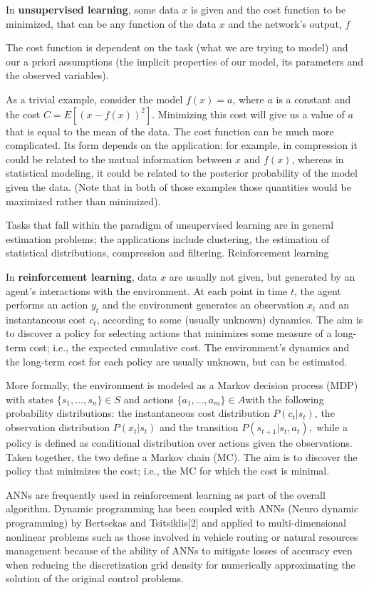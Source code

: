 \documentclass[a4paper,12pt]{article}
\begin{document}
In \textbf{unsupervised learning}, some data $ x $ is given and the cost function to be minimized, that can be any function of the data $ x $ and the network's output, $f$

The cost function is dependent on the task (what we are trying to model) and our a priori assumptions (the implicit properties of our model, its parameters and the observed variables).

As a trivial example, consider the model $f(x) = a$, where $ a $ is a constant and the cost $ C=E[(x - f(x))^2] $. Minimizing this cost will give us a value of $ a $ that is equal to the mean of the data. The cost function can be much more complicated. Its form depends on the application: for example, in compression it could be related to the mutual information between $ x $ and $ f(x) $, whereas in statistical modeling, it could be related to the posterior probability of the model given the data. (Note that in both of those examples those quantities would be maximized rather than minimized).

Tasks that fall within the paradigm of unsupervised learning are in general estimation problems; the applications include clustering, the estimation of statistical distributions, compression and filtering.
Reinforcement learning

In \textbf{reinforcement learning}, data $ x $ are usually not given, but generated by an agent's interactions with the environment. At each point in time $ t $, the agent performs an action $ y_t  $ and the environment generates an observation $ x_t $ and an instantaneous cost $ c_t $, according to some (usually unknown) dynamics. The aim is to discover a policy for selecting actions that minimizes some measure of a long-term cost; i.e., the expected cumulative cost. The environment's dynamics and the long-term cost for each policy are usually unknown, but can be estimated.

More formally, the environment is modeled as a Markov decision process (MDP) with states $ \{s_1,...,s_n\}\in S $ and actions  $\{a_1,...,a_m\} \in A  $with the following probability distributions: the instantaneous cost distribution $ P(c_t|s_t) $, the observation distribution $ P(x_t|s_t) $ and the transition $ P(s_{t+1}|s_t, a_t), $ while a policy is defined as conditional distribution over actions given the observations. Taken together, the two define a Markov chain (MC). The aim is to discover the policy that minimizes the cost; i.e., the MC for which the cost is minimal.

ANNs are frequently used in reinforcement learning as part of the overall algorithm. Dynamic programming has been coupled with ANNs (Neuro dynamic programming) by Bertsekas and Tsitsiklis[2] and applied to multi-dimensional nonlinear problems such as those involved in vehicle routing or natural resources management because of the ability of ANNs to mitigate losses of accuracy even when reducing the discretization grid density for numerically approximating the solution of the original control problems.
\end{document}

